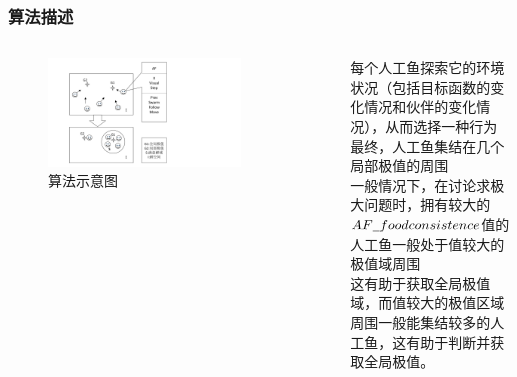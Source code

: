 \begin {frame}
	\frametitle{算法描述}
		\begin{columns}
		\begin{figure}
			\centering
			\includegraphics[width=0.8\textwidth]{pic/fish3.pdf}
			\caption{算法示意图}
		\end{figure}
		
		\small{每个人工鱼探索它的环境状况（包括目标函数的变化情况和伙伴的变化情况），从而选择一种行为\\最终，人工鱼集结在几个局部极值的周围\\一般情况下，在讨论求极大问题时，拥有较大的$AF\underline{\hspace{0.5em}}foodconsistence$值的人工鱼一般处于值较大的极值域周围\\这有助于获取全局极值域，而值较大的极值区域周围一般能集结较多的人工鱼，这有助于判断并获取全局极值。}
		\end{columns}

\end{frame}


